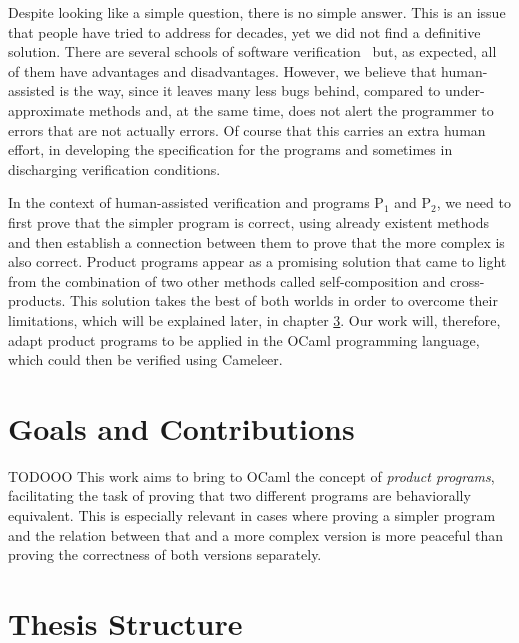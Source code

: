 Despite looking like a simple question, there is no simple answer.
This is an issue that people have tried to address for decades, yet we did not find a definitive solution.
There are several schools of software verification~\cite{DBLP:conf/fm/BrainP24} but, as expected, all of them have advantages and disadvantages.
However, we believe that human-assisted is the way, since it leaves many less bugs behind, compared to under-approximate methods and, at the same time, does not alert the programmer to errors that are not actually errors.
Of course that this carries an extra human effort, in developing the specification for the programs and sometimes in discharging verification conditions.

In the context of human-assisted verification and programs P$_1$ and P$_2$, we need to first prove that the simpler program is correct, using already existent methods and then establish a connection between them to prove that the more complex is also correct.
Product programs appear as a promising solution that came to light from the combination of two other methods called self-composition and cross-products.
This solution takes the best of both worlds in order to overcome their limitations, which will be explained later, in chapter \hyperref[cha:state_of_the_art]{3}.
Our work will, therefore, adapt product programs to be applied in the OCaml programming language, which could then be verified using Cameleer.


\section{Goals and Contributions}

TODOOO
This work aims to bring to OCaml the concept of \emph{product programs}, facilitating the task of proving that two different programs are behaviorally equivalent.
This is especially relevant in cases where proving a simpler program and the relation between that and a more complex version is more peaceful than proving the correctness of both versions separately.


\section{Thesis Structure}


